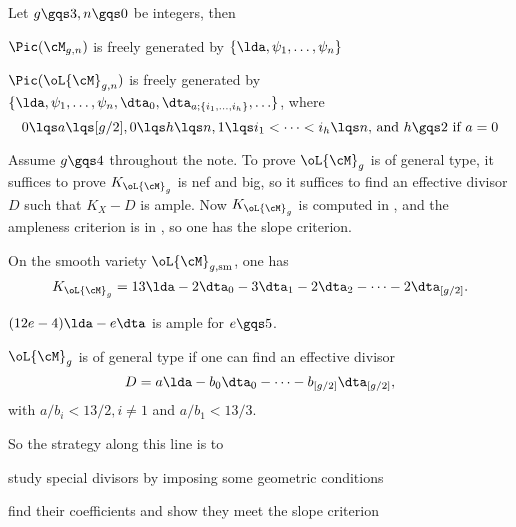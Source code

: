 \documentclass[article, a4paper, twoside]{universal}
\begin{document}
\confighead{}{}{}




\begin{thm}[{\cite[Theorem~2]{AC1987}}]
	Let $g\gqs3,n\gqs0$ be integers, then
	\begin{enr}
		\item $\Pic(\cM_{g,n})$ is freely generated by $\{\lda,\psi_{1},\ldots,\psi_{n}\}$
		\item $\Pic(\oL{\cM}_{g,n})$ is freely generated by $\{\lda,\psi_{1},\ldots,\psi_{n},\dta_{0},\dta_{a;\{i_{1},\ldots,i_{h}\}},\ldots\}$, where
		\[
			\text{$0\lqs a\lqs[g/2], 0\lqs h\lqs n, 1\lqs i_{1}<\cdots<i_{h}\lqs n$, and $h\gqs2$ if $a=0$}
		\]
	\end{enr}
\end{thm}


Assume $g\gqs4$ throughout the note. To prove $\oL{\cM}_{g}$ is of general type, it suffices to prove $K_{\oL{\cM}_{g}}$ is nef and big, so it suffices to find an effective divisor $D$ such that $K_{X}-D$ is ample. Now $K_{\oL{\cM}_{g}}$ is computed in \cite{HM1982}, and the ampleness criterion is in \cite{Mumford1977Stability}, so one has the slope criterion.

\begin{thm}
	On the smooth variety $\oL{\cM}_{g,\mathrm{sm}}$, one has
	\[
		K_{\oL{\cM}_{g}}=13\lda-2\dta_{0}-3\dta_{1}-2\dta_{2}-\cdots-2\dta_{[g/2]}.
	\]
\end{thm}

\begin{thm}
	$(12e-4)\lda-e\dta$ is ample for $e\gqs5$.
\end{thm}

\begin{cor}
	$\oL{\cM}_{g}$ is of general type if one can find an effective divisor
	\[
		D=a\lda-b_{0}\dta_{0}-\cdots-b_{[g/2]}\dta_{[g/2]},
	\]
	with $a/b_{i}<13/2, i\neq1$ and $a/b_{1}<13/3$.
\end{cor}

\begin{rmk}
	So the strategy along this line is to
	\begin{enr}
		\item study special divisors by imposing some geometric conditions
		\item find their coefficients and show they meet the slope criterion
	\end{enr}
\end{rmk}
\end{document}
